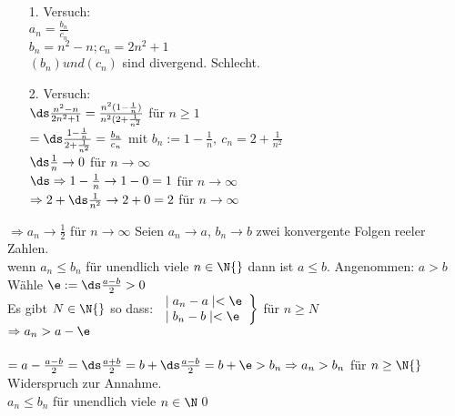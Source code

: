 \begin{itemize}
\item[1.]{Versuch:\\
$a_n = \frac{b_n}{c_n}$\\[4pt]
$b_n = n^2 -n; c_n = 2n^2 + 1$\\
$(b_n) und (c_n)$ sind divergend. Schlecht.}
\item[2.]{Versuch:\\
$\ds\frac{n^2 - n}{2n^2 + 1} = \frac{n^2(1 - \frac{1}{n})}{n^2(2 + \frac{1}{n^2}}$ für $n \geq 1$\\[4pt]
$= \ds\frac{1-\frac{1}{n}}{2 +\frac{1}{n^2}}=\frac{b_n}{c_n}$ mit $b_n:=1-\frac{1}{n},\ c_n = 2 + \frac{1}{n^2}$\\[4pt]
$\ds\frac{1}{n} \to 0$ für $n \to ∞ $\\[4pt]
$\ds\Rightarrow 1 - \frac{1}{n} \to 1 - 0 = 1$ für $n \to ∞$\\[4pt]
$\Rightarrow 2 + \ds\frac{1}{n^2} \to 2 + 0 = 2$ für $n \to ∞$}
\end{itemize}
%
$\Rightarrow a_n \to \frac{1}{2}$ für $n \to ∞$
%
Seien $a_n \to a$, $b_n \to b$ zwei konvergente Folgen reeler Zahlen.\\
wenn $a_n \leq b_n$ für unendlich viele $n \in \N{}$ dann ist $a \leq b$.
\bew
Angenommen: $a > b$\\

Wähle $\e := \ds\frac{a - b}{2} > 0$\\
Es gibt $N \in \N{}$ so dass:
$
\left.
\begin{array}{ll}
\mid a_n - a \mid  < \e \\
\mid b_n - b \mid  < \e
\end{array} \right\rbrace$ für $n \geq N$\\
$\Rightarrow a_n > a - \e$\\ \\
$= a - \frac{a - b}{2} = \ds\frac{a + b}{2} = b + \ds\frac{a - b}{2}\\
\\
= b + \e > b_n \Rightarrow a_n > b_n$ für $n \geq \N{}$\\
Widerspruch zur Annahme.\\
$a_n \leq b_n$ für unendlich viele $n \in \N$\qed

